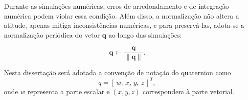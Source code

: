 Durante as simulações numéricas, erros de arredondamento e de integração numérica podem violar essa condição.
Além disso, a normalização não altera a atitude, apenas mitiga inconsistências numéricas, e para preservá-las, adota-se a normalização periódica do vetor $\mathbf{q}$ ao longo das simulações:

\begin{equation}
\mathbf{q}
\leftarrow
\frac{\mathbf{q}}{\lVert \mathbf{q} \rVert}.
\end{equation}

Nesta dissertação será adotada a convenção de notação do quaternion como
\begin{equation}
q = [\,w,\,x,\,y,\,z\,]^T,
\label{eq:quat_convencao}
\end{equation}
onde $w$ representa a parte escalar e $(x,y,z)$ correspondem à parte vetorial.


